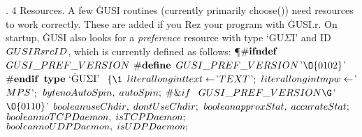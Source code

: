 . 4 Resources. A few \.{GUSI} routines (currently primarily choose()) need
resources
to work correctly. These are added if you Rez your program with \.{GUSI.r}. On
startup, \.{GUSI} also looks for a {\it preference} resource with type
\.{`GU$\Sigma$I'} and ID \CD{}$\\{GUSIRsrcID}$\DC{}, which is currently defined
as follows:
\Y\P\8$\#{\let\\=\bf \\{ifndef}}$\1{} $\\{GUSI\_PREF\_VERSION}$\2\6
\8$\#{\let\\=\bf \\{define}}$\1{} $\\{GUSI\_PREF\_VERSION}$'$\O{0102}$'\2\6
\8$\#{\let\\=\bf \\{endif}}$\1{} \2\7
$\hbox{{\bf type} `\.{GU$\Sigma$I}' }$\1 $\{\1$\6
$\\{literal}\ \\{longint}\ \\{text}\leftarrow$'$\\{TEXT}$'$;$\5
\6
$\\{literal}\ \\{longint}\ \\{mpw}\leftarrow$'$\\{MPS}$'$;$\5
\6
$\\{byte}\ \\{noAutoSpin},\;\ \\{autoSpin};$\5
\6
\8$\#{\let\\=\bf \&{if}\ }$\1{} $\\{GUSI\_PREF\_VERSION}\G$'$\O{0110}$'\2\6
$\\{boolean}\ \\{useChdir},\;\ \\{dontUseChdir};$\5
\6
$\\{boolean}\ \\{approxStat},\;\ \\{accurateStat};$\5
\6
$\\{boolean}\ \\{noTCPDaemon},\;\ \\{isTCPDaemon};$\5
\6
$\\{boolean}\ \\{noUDPDaemon},\;\ \\{isUDPDaemon};$\6
